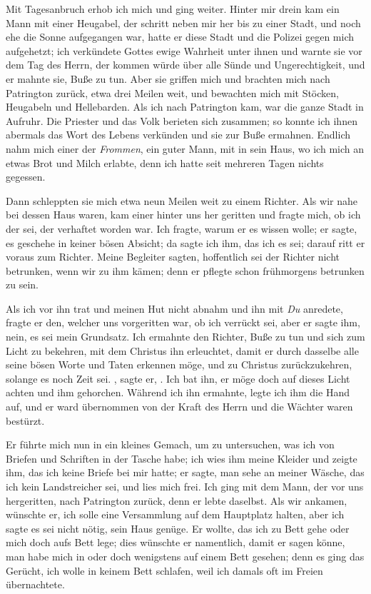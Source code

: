 Mit Tagesanbruch erhob ich mich
und ging weiter. Hinter mir drein kam ein Mann mit einer
Heugabel, der schritt neben mir her bis zu einer Stadt, und
noch ehe die Sonne aufgegangen war, hatte er diese Stadt und
die Polizei gegen mich aufgehetzt; ich verkündete Gottes ewige
Wahrheit unter ihnen und warnte sie vor dem Tag des Herrn,
der kommen würde über alle Sünde und Ungerechtigkeit, und er
mahnte sie, Buße zu tun. Aber sie griffen mich und brachten
mich nach Patrington zurück, etwa drei 
Meilen weit, und 
bewachten mich mit Stöcken, Heugabeln und Hellebarden. Als ich
nach Patrington kam, war die ganze Stadt in Aufruhr. Die
Priester und das Volk berieten sich zusammen; so konnte ich
ihnen abermals das Wort des Lebens verkünden und sie zur Buße
ermahnen. Endlich nahm mich einer der \textit{Frommen}, ein guter
Mann, mit in sein Haus, wo ich mich an etwas Brot und Milch
erlabte, denn ich hatte seit mehreren Tagen nichts gegessen. 


Dann schleppten sie mich etwa neun Meilen weit zu einem Richter.
Als wir nahe bei dessen Haus waren, kam einer hinter uns her
geritten und fragte mich, ob ich der sei, der verhaftet worden
war. Ich fragte, warum er es wissen wolle; er sagte, es 
geschehe in keiner bösen Absicht; da sagte ich ihm, das ich es
sei; darauf ritt er voraus zum Richter. Meine Begleiter sagten,
hoffentlich sei der Richter nicht betrunken, wenn wir zu ihm
kämen; denn er pflegte schon frühmorgens betrunken zu sein.

Als ich vor ihn trat und meinen Hut 
nicht abnahm und ihn mit
\textit{Du} anredete, fragte er den, 
welcher uns vorgeritten war, ob ich
verrückt sei, aber er sagte ihm, nein, es sei mein Grundsatz. Ich
ermahnte den Richter, Buße zu tun und sich zum Licht zu 
bekehren, mit dem Christus ihn erleuchtet, damit er durch dasselbe
alle seine bösen Worte und Taten erkennen möge, und zu Christus
zurückzukehren, solange es noch Zeit sei. , sagte er, .
Ich bat ihn, er möge doch auf dieses Licht achten und ihm 
gehorchen. Während ich ihn ermahnte, legte ich ihm 
die Hand auf,
und er ward übernommen von der Kraft des Herrn und die
Wächter waren bestürzt. 

Er führte mich nun in ein kleines Gemach,
um zu untersuchen, was ich von Briefen und Schriften in der
Tasche habe; ich wies ihm meine Kleider und zeigte ihm, das
ich keine Briefe bei mir hatte; er sagte, man sehe an meiner
Wäsche, das ich kein Landstreicher sei, und lies mich frei. Ich
ging mit dem Mann, der vor uns hergeritten, nach Patrington
zurück, denn er lebte daselbst. Als wir ankamen, wünschte er, ich
solle eine Versammlung auf dem Hauptplatz halten, aber ich sagte
es sei nicht nötig, sein Haus genüge. Er wollte, das ich zu Bett
gehe oder mich doch aufs Bett lege; dies wünschte er namentlich,
damit er sagen könne, man habe mich in oder doch wenigstens
auf einem Bett gesehen; denn es ging das Gerücht, ich wolle
in keinem Bett schlafen, weil ich damals oft im Freien 
übernachtete. 

